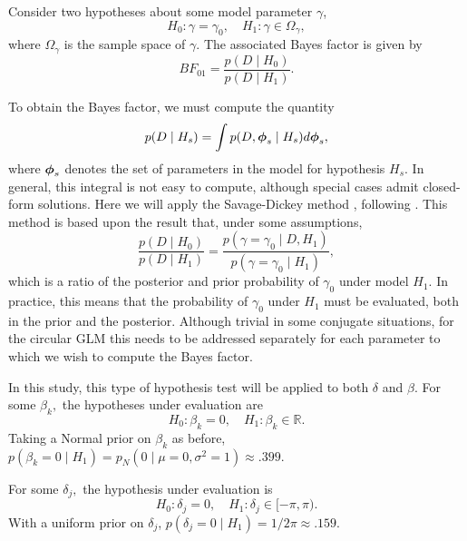 Consider two hypotheses about some model parameter \( \gamma \),
\begin{equation}
H_0 : \gamma = \gamma_0 , \quad H_1 : \gamma \in \Omega_\gamma,
\end{equation}
where \( \Omega_\gamma \) is the sample space of \( \gamma \). The associated Bayes factor is given by
\begin{equation}
BF_{01} = \frac{p(D \mid H_0)}{p(D \mid H_1)}.
\end{equation}

To obtain the Bayes factor, we must compute the quantity
\begin{equation}
p(D \mid H_s) = \int p(D, \boldsymbol{\phi}_s \mid H_s) d \boldsymbol{\phi}_s,
\end{equation}
where \( \boldsymbol{\phi}_s \) denotes the set of parameters in the model for hypothesis \( H_s.\) In general, this integral is not easy to compute, although special cases admit closed-form solutions. Here we will apply the Savage-Dickey method \citep{dickey1970weighted, o2004kendall}, following \citet{wagenmakers2010sdd}. This method is based upon the result that, under some assumptions,
\begin{equation}
\frac{p(D \mid H_0)}{p(D \mid H_1)} = \frac{p(\gamma = \gamma_0 \mid D, H_1)}{p(\gamma = \gamma_0 \mid H_1)},
\end{equation}
which is a ratio of the posterior and prior probability of \( \gamma_0 \) under model \( H_1.\) In practice, this means that the probability of \( \gamma_0 \) under \( H_1 \) must be evaluated, both in the prior and the posterior. Although trivial in some conjugate situations, for the circular GLM this needs to be addressed separately for each parameter to which we wish to compute the Bayes factor.

In this study, this type of hypothesis test will be applied to both \( \delta \) and \( \beta.\) For some \( \beta_k,\) the hypotheses under evaluation are
\begin{equation}
H_0 : \beta_k = 0 , \quad H_1 : \beta_k \in \mathbb{R}.
\end{equation}
Taking a Normal prior on \( \beta_k \) as before, \( p(\beta_k = 0 \mid H_1) = p_N(0 \mid \mu = 0, \sigma^2 = 1) \approx .399.\)

For some \( \delta_j,\) the hypothesis under evaluation is
\begin{equation}
H_0 : \delta_j = 0 , \quad H_1 : \delta_j \in [ -\pi, \pi ).
\end{equation}
With a uniform prior on \(\delta_j \), \( p(\delta_j = 0 \mid H_1) = 1/2\pi \approx .159.\)

